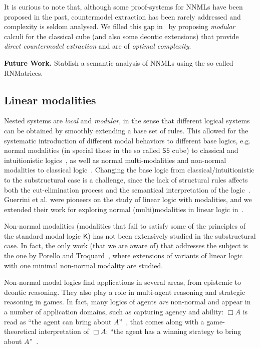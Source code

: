 \documentclass[11pt,a4paper]{article}
\newcommand{\K}{\mathsf{K}}
\begin{document}
It is curious to note that, although some proof-systems for NNMLs have been proposed in the past, countermodel extraction has been rarely addressed and complexity is seldom analysed. We filled this gap in~\cite{DBLP:journals/logcom/DalmonteLOP21} by
proposing \emph{modular} 
calculi for the classical cube (and also some deontic extensions)  that provide  {\em direct countermodel extraction} 
and are of {\em optimal complexity}.  

{\bf Future Work.} Stablish a semantic analysis of NNMLs using the so called RNMatrices.

\subsection{Linear modalities} 
Nested systems are {\em local} and {\em modular}, in the sense that different logical systems can be obtained by smoothly  extending a base set of rules.
This allowed for the systematic introduction of different modal behaviors to different  base logics, e.g.
normal modalities (in special those in the  so called $\mathsf{S5}$ cube)  to classical and intuitionistic logics~\cite{DBLP:conf/rta/ChaudhuriMS16}, as well as
normal multi-modalities and non-normal modalities to classical logic~\cite{DBLP:journals/tocl/LellmannP19}. 
Changing the base logic from classical/intuitionistic to the substructural case is a challenge,
since the lack of structural rules affects both the cut-elimination process and the semantical interpretation of the logic~\cite{DBLP:conf/lics/CiabattoniGT08}. Guerrini et al. were pioneers on the study of linear logic with modalities, and we extended their work  for exploring normal (multi)modalities in linear logic in~\cite{DBLP:conf/lpar/LellmannOP17}. 

Non-normal modalities (modalities that fail to satisfy some of the principles of the standard modal logic $\K$)  has not been extensively studied in the substructural case. In fact, the only work (that  we are aware of) that addresses the subject is the one by Porello and Troquard~\cite{DBLP:journals/jancl/PorelloT15}, where extensions of variants of linear logic with one minimal non-normal modality are studied. 

Non-normal modal logics  find applications in several areas,  from epistemic to deontic reasoning. They also play a role in multi-agent reasoning and strategic reasoning in games. In fact, many logics of agents {\em are} non-normal and appear in a number of application domains, such as capturing agency and ability: $\Box A$ is read as ``the agent can bring about $A$''~\cite{Elgesem:1997}, that comes along with a game-theoretical interpretation of $\Box A$: ``the agent has a winning strategy to bring about $A$''~\cite{DBLP:journals/logcom/Pauly02}. 
\end{document}
